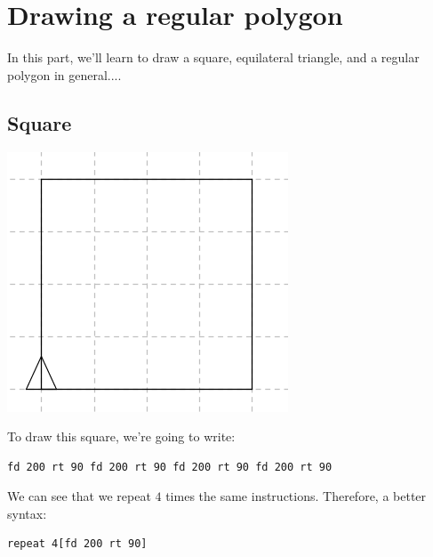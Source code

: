 \section{Drawing a regular polygon}
\noindent In this part, we'll learn to draw a square, equilateral triangle, and a regular polygon in general....
\subsection{Square}
\begin{center}
\includegraphics{pics/bases-carre.png}
\end{center}
\noindent To draw this square, we're going to write:
\begin{verbatim}
fd 200 rt 90 fd 200 rt 90 fd 200 rt 90 fd 200 rt 90
\end{verbatim}
We can see that we repeat $4$ times the same instructions. Therefore, a better syntax:
\begin{verbatim}
repeat 4[fd 200 rt 90]
\end{verbatim}
